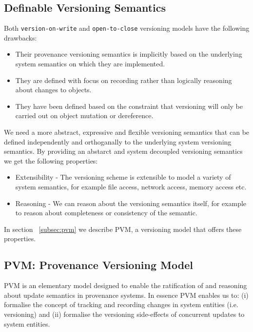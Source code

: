 \documentclass[withindex,glossary]{cam-thesis}
\begin{document}
\subsection{Definable Versioning Semantics}
Both \texttt{version-on-write} and \texttt{open-to-close} versioning models have the following drawbacks:
\begin{itemize}
\item Their provenance versioning semantics is implicitly based on the underlying system semantics on which they are implemented.
\item They are defined with focus on recording rather than logically reasoning about changes to objects.
\item They have been defined based on the constraint that versioning will only be carried out on object mutation or dereference.
\end{itemize}

We need a more abstract, expressive and flexible versioning semantics that can be defined independently and orthoganally to the underlying system versioning semantics.
By providing an abstarct and system decoupled versioning semantics we get the following properties:
\begin{itemize}
\item Extensibility - The versioning scheme is extensible to model a variety of system semantics, for example file access, network access, memory access etc.
\item Reasoning - We can reason about the versioning semantics itself, for example to reason about completeness or consistency of the semantic.
\end{itemize}

In section ~\ref{subsec:pvm} we describe PVM, a versioning model that offers these properties.

\subsection{PVM: Provenance Versioning Model}
PVM is an elementary model designed to enable the ratification of and reasoning about update semantics in provenance systems.
In essence PVM enables us to:
(i) formalise the concept of tracking and recording changes in system entities (i.e. versioning) and
(ii) formalise the versioning side-effects of concurrent updates to system entities.

%
%
%
%
\end{document}
